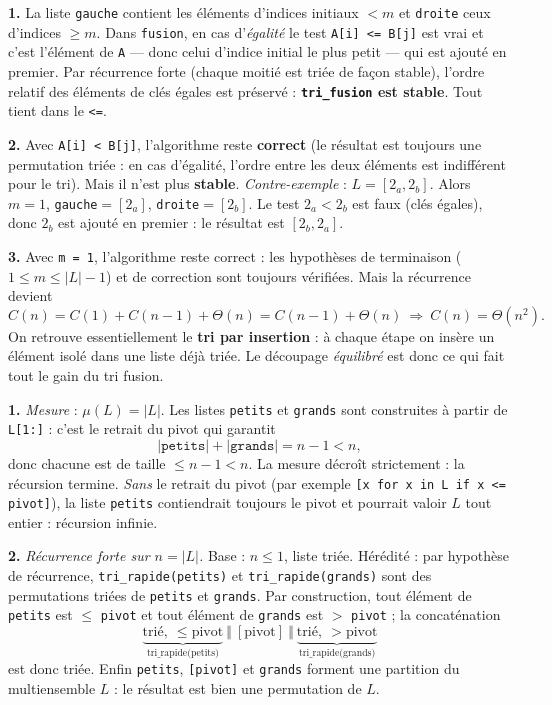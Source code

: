 \documentclass[11pt,a4paper]{article}
\begin{document}
\reponse
\textbf{1.} La liste \texttt{gauche} contient les éléments d'indices initiaux $<m$ et
\texttt{droite} ceux d'indices $\ge m$. Dans \texttt{fusion}, en cas d'\emph{égalité}
le test \texttt{A[i] <= B[j]} est vrai et c'est l'élément de \texttt{A} --- donc celui
d'indice initial le plus petit --- qui est ajouté en premier. Par récurrence forte
(chaque moitié est triée de façon stable), l'ordre relatif des éléments de clés égales
est préservé : \textbf{\texttt{tri\_fusion} est stable}. Tout tient dans le
\texttt{<=}.

\textbf{2.} Avec \texttt{A[i] < B[j]}, l'algorithme reste \textbf{correct} (le résultat
est toujours une permutation triée : en cas d'égalité, l'ordre entre les deux éléments
est indifférent pour le tri). Mais il n'est plus \textbf{stable}.
\emph{Contre-exemple} : $L=[2_a,2_b]$. Alors $m=1$, \texttt{gauche}$=[2_a]$,
\texttt{droite}$=[2_b]$. Le test $2_a<2_b$ est faux (clés égales), donc $2_b$ est
ajouté en premier : le résultat est $[2_b,2_a]$.

\textbf{3.} Avec \texttt{m = 1}, l'algorithme reste correct : les hypothèses de
terminaison ($1\le m\le|L|-1$) et de correction sont toujours vérifiées. Mais la
récurrence devient
\[
  C(n)=C(1)+C(n-1)+\Theta(n)=C(n-1)+\Theta(n)\ \Longrightarrow\ C(n)=\Theta(n^{2}).
\]
On retrouve essentiellement le \textbf{tri par insertion} : à chaque étape on insère un
élément isolé dans une liste déjà triée. Le découpage \emph{équilibré} est donc ce qui
fait tout le gain du tri fusion.


\reponse
\textbf{1.} \emph{Mesure} : $\mu(L)=|L|$. Les listes \texttt{petits} et \texttt{grands}
sont construites à partir de \texttt{L[1:]} : c'est le retrait du pivot qui garantit
\[
  |\texttt{petits}|+|\texttt{grands}| = n-1 < n,
\]
donc chacune est de taille $\le n-1<n$. La mesure décroît strictement : la récursion
termine. \emph{Sans} le retrait du pivot (par exemple \texttt{[x for x in L if x <= pivot]}),
la liste \texttt{petits} contiendrait toujours le pivot et pourrait valoir $L$ tout
entier : récursion infinie.

\textbf{2.} \emph{Récurrence forte sur $n=|L|$.} Base : $n\le1$, liste triée.
Hérédité : par hypothèse de récurrence, \texttt{tri\_rapide(petits)} et
\texttt{tri\_rapide(grands)} sont des permutations triées de \texttt{petits} et
\texttt{grands}. Par construction, tout élément de \texttt{petits} est $\le$
\texttt{pivot} et tout élément de \texttt{grands} est $>$ \texttt{pivot} ; la
concaténation
\[
  \underbrace{\text{trié},\ \le \text{pivot}}_{\text{tri\_rapide(petits)}}
  \ \Vert\ [\text{pivot}]\ \Vert\
  \underbrace{\text{trié},\ >\text{pivot}}_{\text{tri\_rapide(grands)}}
\]
est donc triée. Enfin \texttt{petits}, \texttt{[pivot]} et \texttt{grands} forment une
partition du multiensemble $L$ : le résultat est bien une permutation de $L$. \checkmark
\end{document}
